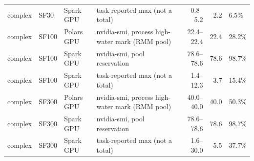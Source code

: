 \begin{tabular}{llllrrl}
complex & SF30 & Spark GPU & task-reported max (not a total) & 0.8--5.2 & 2.2 & 6.5\% \\
complex & SF100 & Polars GPU & nvidia-smi, process high-water mark (RMM pool) & 22.4--22.4 & 22.4 & 28.2\% \\
complex & SF100 & Spark GPU & nvidia-smi, pool reservation & 78.6--78.6 & 78.6 & 98.7\% \\
complex & SF100 & Spark GPU & task-reported max (not a total) & 1.4--12.3 & 3.7 & 15.4\% \\
complex & SF300 & Polars GPU & nvidia-smi, process high-water mark (RMM pool) & 40.0--40.0 & 40.0 & 50.3\% \\
complex & SF300 & Spark GPU & nvidia-smi, pool reservation & 78.6--78.6 & 78.6 & 98.7\% \\
complex & SF300 & Spark GPU & task-reported max (not a total) & 1.6--30.0 & 5.5 & 37.7\% \\
\bottomrule
\end{tabular}
